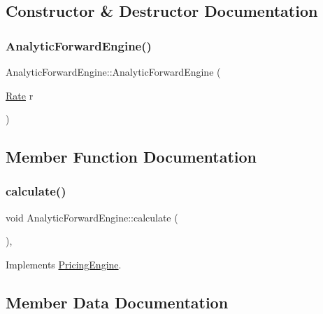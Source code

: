 \subsection{Constructor \& Destructor Documentation}
\hypertarget{class_analytic_forward_engine_a7745431773dc2910c8aa01183b7780d0}{}\label{class_analytic_forward_engine_a7745431773dc2910c8aa01183b7780d0} 
\subsubsection{\texorpdfstring{Analytic\+Forward\+Engine()}{AnalyticForwardEngine()}}
{\footnotesize\ttfamily Analytic\+Forward\+Engine\+::\+Analytic\+Forward\+Engine (\begin{DoxyParamCaption}\item[{\hyperlink{_name_def_8h_a25bee43a162de339c81f3d1caf6b887d}{Rate}}]{r }\end{DoxyParamCaption})}



\subsection{Member Function Documentation}
\hypertarget{class_analytic_forward_engine_a12d6791a13bf727d43ffcff9cb55b094}{}\label{class_analytic_forward_engine_a12d6791a13bf727d43ffcff9cb55b094} 
\subsubsection{\texorpdfstring{calculate()}{calculate()}}
{\footnotesize\ttfamily void Analytic\+Forward\+Engine\+::calculate (\begin{DoxyParamCaption}{ }\end{DoxyParamCaption})\hspace{0.3cm}{\ttfamily [override]}, {\ttfamily [virtual]}}



Implements \hyperlink{class_pricing_engine_a733511ffc3cf5e4dc1fbc2a39208d8bd}{Pricing\+Engine}.



\subsection{Member Data Documentation}
\hypertarget{class_analytic_forward_engine_a4398f98b358ec1800db1e8e609b45321}{}\label{class_analytic_forward_engine_a4398f98b358ec1800db1e8e609b45321} 

